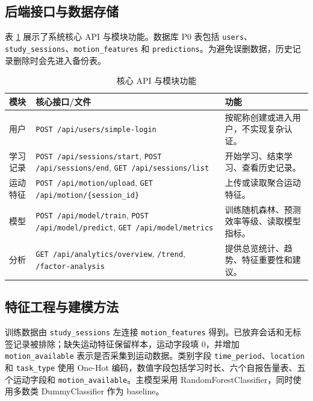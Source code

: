 \documentclass[UTF8,a4paper,fontset=fandol]{ctexart}
\begin{document}
\subsection{后端接口与数据存储}

表 \ref{tab:api} 展示了系统核心 API 与模块功能。数据库 P0 表包括 \texttt{users}、\texttt{study\_sessions}、\texttt{motion\_features} 和 \texttt{predictions}。为避免误删数据，历史记录删除时会先进入备份表。

\begin{table}[htbp]
  \centering
  \caption{核心 API 与模块功能}
  \label{tab:api}
  \small
  \begin{tabularx}{0.95\textwidth}{p{2.2cm}p{5.8cm}X}
    \toprule
    模块 & 核心接口/文件 & 功能 \\
    \midrule
    用户 & \texttt{POST /api/users/simple-login} & 按昵称创建或进入用户，不实现复杂认证。 \\
    学习记录 & \texttt{POST /api/sessions/start}, \texttt{POST /api/sessions/end}, \texttt{GET /api/sessions/list} & 开始学习、结束学习、查看历史记录。 \\
    运动特征 & \texttt{POST /api/motion/upload}, \texttt{GET /api/motion/\{session\_id\}} & 上传或读取聚合运动特征。 \\
    模型 & \texttt{POST /api/model/train}, \texttt{POST /api/model/predict}, \texttt{GET /api/model/metrics} & 训练随机森林、预测效率等级、读取模型指标。 \\
    分析 & \texttt{GET /api/analytics/overview}, \texttt{/trend}, \texttt{/factor-analysis} & 提供总览统计、趋势、特征重要性和建议。 \\
    \bottomrule
  \end{tabularx}
\end{table}

\subsection{特征工程与建模方法}

训练数据由 \texttt{study\_sessions} 左连接 \texttt{motion\_features} 得到。已放弃会话和无标签记录被排除；缺失运动特征保留样本，运动字段填 0，并增加 \texttt{motion\_available} 表示是否采集到运动数据。类别字段 \texttt{time\_period}、\texttt{location} 和 \texttt{task\_type} 使用 One-Hot 编码，数值字段包括学习时长、六个自报告量表、五个运动字段和 \texttt{motion\_available}。主模型采用 RandomForestClassifier，同时使用多数类 DummyClassifier 作为 baseline。
\end{document}
